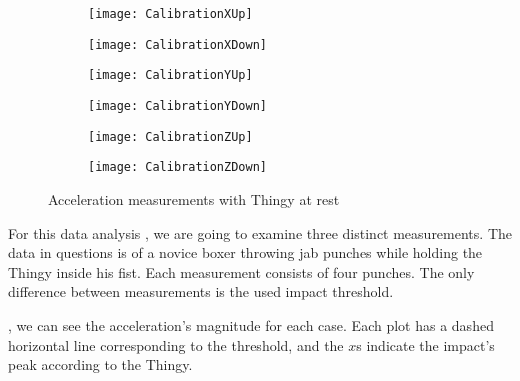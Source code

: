 \begin{figure}[hbt!]
	\centering
	\begin{subfigure}{0.48\linewidth}
		\centering
		\texttt{[image: CalibrationXUp]}
	\end{subfigure}
	\begin{subfigure}{0.48\linewidth}
		\centering
		\texttt{[image: CalibrationXDown]}
	\end{subfigure}
\end{figure}

\begin{figure}[hbt!]\ContinuedFloat
	\centering
	\begin{subfigure}{0.48\linewidth}
		\centering
		\texttt{[image: CalibrationYUp]}
	\end{subfigure}
	\begin{subfigure}{0.48\linewidth}
		\centering
		\texttt{[image: CalibrationYDown]}
	\end{subfigure}
\end{figure}

\begin{figure}[hbt!]\ContinuedFloat
	\centering
	\begin{subfigure}{0.48\linewidth}
		\centering
		\texttt{[image: CalibrationZUp]}
	\end{subfigure}
	\begin{subfigure}{0.48\linewidth}
		\centering
		\texttt{[image: CalibrationZDown]}
	\end{subfigure}
	\caption{Acceleration measurements with Thingy at rest}
	\label{fig:acc_cal}
\end{figure}

For this data analysis , we are going to examine three distinct measurements. The data in questions is of a novice boxer throwing jab punches while holding the Thingy inside his fist. Each measurement consists of four punches. The only difference between measurements is the used impact threshold.

, we can see the acceleration's magnitude for each case. Each plot has a dashed horizontal line corresponding to the threshold, and the $x$s indicate the impact's peak according to the Thingy. 

